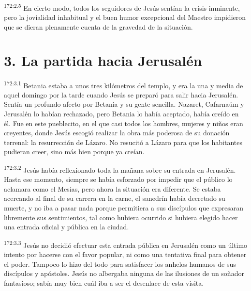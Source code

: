 \par 
\textsuperscript{172:2.5} En cierto modo, todos los seguidores de Jesús sentían la crisis inminente, pero la jovialidad inhabitual y el buen humor excepcional del Maestro impidieron que se dieran plenamente cuenta de la gravedad de la situación.

\section*{3. La partida hacia Jerusalén}
\par 
\textsuperscript{172:3.1} Betania estaba a unos tres kilómetros del templo, y era la una y media de aquel domingo por la tarde cuando Jesús se preparó para salir hacia Jerusalén. Sentía un profundo afecto por Betania y su gente sencilla. Nazaret, Cafarnaúm y Jerusalén lo habían rechazado, pero Betania lo había aceptado, había creído en él. Fue en este pueblecito, en el que casi todos los hombres, mujeres y niños eran creyentes, donde Jesús escogió realizar la obra más poderosa de su donación terrenal: la resurrección de Lázaro. No resucitó a Lázaro para que los habitantes pudieran creer, sino más bien porque ya creían.

\par 
\textsuperscript{172:3.2} Jesús había reflexionado toda la mañana sobre su entrada en Jerusalén. Hasta ese momento, siempre se había esforzado por impedir que el público lo aclamara como el Mesías, pero ahora la situación era diferente. Se estaba acercando al final de su carrera en la carne, el sanedrín había decretado su muerte, y no iba a pasar nada porque permitiera a sus discípulos que expresaran libremente sus sentimientos, tal como hubiera ocurrido si hubiera elegido hacer una entrada oficial y pública en la ciudad.

\par 
\textsuperscript{172:3.3} Jesús no decidió efectuar esta entrada pública en Jerusalén como un último intento por hacerse con el favor popular, ni como una tentativa final para obtener el poder. Tampoco lo hizo del todo para satisfacer los anhelos humanos de sus discípulos y apóstoles. Jesús no albergaba ninguna de las ilusiones de un soñador fantasioso; sabía muy bien cuál iba a ser el desenlace de esta visita.

